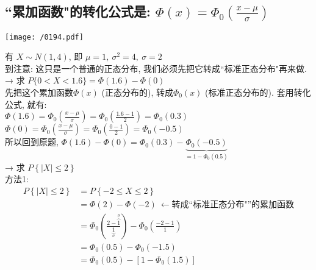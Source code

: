 \documentclass[UTF8]{ctexart}
\begin{document}
\subsection{``累加函数"的转化公式是: $\boxed{\varPhi (x)=\varPhi _0(\frac{x-\mu}{\sigma})	}$}

\texttt{[image: /0194.pdf]} \\




\begin{myEnvSample}
有 $X \sim N(1,4)$, 即 $\mu=1, \ \sigma^2=4,\ \sigma=2$ \\
到注意: 这只是一个普通的正态分布, 我们必须先把它转成``标准正态分布"再来做. \\

→ 求 $P\{0<X<1.6\} =\varPhi (1.6)-\varPhi (0)$ \\
先把这个累加函数$\Phi (x)$ (正态分布的), 转成$\Phi_0 (x)$ (标准正态分布的). 套用转化公式, 就有: \\
$	\varPhi (1.6)=\varPhi _0\left( \frac{x-\mu}{\sigma} \right) =\varPhi _0\left( \frac{1.6-1}{2} \right) =\varPhi _0(0.3)$ \\
$	\varPhi (0)=\varPhi _0\left( \frac{x-\mu}{\sigma} \right) =\varPhi _0\left( \frac{0-1}{2} \right) =\varPhi _0(-0.5)$ \\

所以回到原题, $
\varPhi (1.6)-\varPhi (0)=\varPhi _0(0.3)-\underset{=1-\varPhi _0(0.5)}{\underbrace{\varPhi _0(-0.5)}}
$ \\

→ 求 $P\left\{ |X|\leq 2 \right\} $ \\
方法1: 
\begin{align*}  %
	P\left\{ |X|\leq 2 \right\} &=P\left\{ -2\leq X\leq 2 \right\}\\
&=\varPhi \left( 2 \right) -\varPhi \left( -2 \right) \ \gets \text{转成} \text{``标准正态分布"}\text{的累加函数}\\
&=\varPhi _0\left( \frac{2-\overset{\mu}{\overbrace{1}}}{\underset{\sigma}{\underbrace{1}}} \right) -\varPhi _0\left( \frac{-2-1}{1} \right)\\
&=\varPhi _0\left( 0.5 \right) -\varPhi _0\left( -1.5 \right)\\
&=\varPhi _0\left( 0.5 \right) -\left[ 1-\varPhi _0\left( 1.5 \right) \right]
\end{align*} 


\end{myEnvSample}
\end{document}
